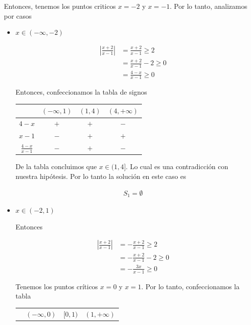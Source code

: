 \documentclass[12pt]{book}
\begin{document}
Entonces, tenemos los puntos criticos $x=-2$ y $x=-1$. Por lo tanto, analizamos por casos

\begin{itemize}
    \item $x \in (-\infty,-2)$

    \begin{align*}
        \left|\frac{x+2}{x-1} \right|&=\frac{x+2}{x-1} \geq 2 \\
        &= \frac{x+2}{x-1} -2 \geq 0 \\
        &= \frac{4-x}{x-1} \geq 0
    \end{align*}

    Entonces, confeccionamos la tabla de signos

    \begin{center}
\begin{tabular}{|c|c|c|c|}
\hline
   & $(-\infty,1) $  & $(1,4)$ & $(4,+\infty)$ \\
   \hline
   $4-x$ & $+$ &$+$ &  $-$ \\ \hline
   $x-1$ & $-$ & $+$ & $+$ \\ \hline \hline
\rule{0pt}{20pt} $\displaystyle \frac{4-x}{x-1}$ & $-$ & $+$ & $-$ \\
   \hline
\end{tabular}
\end{center}

De la tabla concluimos que  $x \in (1,4]$. Lo cual es una contradicción con nuestra hipótesis. Por lo tanto la solución en este caso es 

\begin{align*}
    S_1 = \emptyset
\end{align*}

\item $x \in (-2,1)$

Entonces 

\begin{align*}
    \left|\frac{x+2}{x-1} \right|&=-\frac{x+2}{x-1} \geq 2 \\
    &=-\frac{x+2}{x-1} -2 \geq 0 \\
    &=-\frac{3x}{x-1} \geq 0 
\end{align*}

Tenemos los puntos críticos $x=0$ y $x=1$. Por lo tanto, confeccionamos la tabla 
\begin{center}
\begin{tabular}{|c|c|c|c|}
\hline
   & $(-\infty,0) $  & $[0,1)$ &  $(1, +\infty)$\\


\end{tabular}
\end{center}
\end{itemize}
\end{document}
